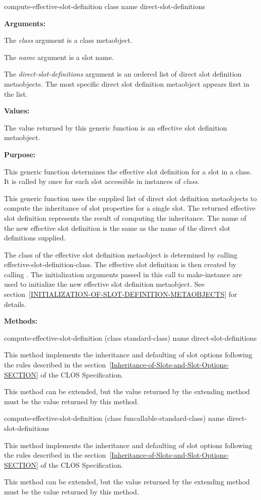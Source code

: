 \begin{defun}
compute-effective-slot-definition class name direct-slot-definitions

\textbf{Arguments:}

The \emph{class} argument is a class metaobject.

The \emph{name} argument is a slot name.

The \emph{direct-slot-definitions} argument is an ordered list of direct slot
definition metaobjects. The most specific direct slot definition metaobject
appears first in the list.

\textbf{Values:}

The value returned by this generic function is an effective slot definition
metaobject.

\textbf{Purpose:}

This generic function determines the effective slot definition for a slot in a
class. It is called by  once for each slot accessible in instances
of \emph{class}.

This generic function uses the supplied list of direct slot definition
metaobjects to compute the inheritance of slot properties for a single slot. The
returned effective slot definition represents the result of computing the
inheritance. The name of the new effective slot definition is the same as the
name of the direct slot definitions supplied.

The class of the effective slot definition metaobject is determined by calling
effective-slot-definition-class. The effective slot definition is then created
by calling . The initialization arguments passed in this call to
make-instance are used to initialize the new effective slot definition
metaobject. See section~\ref{INITIALIZATION-OF-SLOT-DEFINITION-METAOBJECTS} for details.

\textbf{Methods:}

\begin{defun}
compute-effective-slot-definition (class standard-class) name direct-slot-definitions

This method implements the inheritance and defaulting of slot options following
the rules described in the
section~\ref{Inheritance-of-Slots-and-Slot-Options-SECTION} of the
CLOS Specification.

This method can be extended, but the value returned by the extending method must
be the value returned by this method.
\end{defun}

\begin{defun}
compute-effective-slot-definition (class funcallable-standard-class) name direct-slot-definitions

This method implements the inheritance and defaulting of slot options following
the rules described in the
section~\ref{Inheritance-of-Slots-and-Slot-Options-SECTION} of the CLOS
Specification.

This method can be extended, but the value returned by the extending method must
be the value returned by this method.
\end{defun}
\end{defun}

